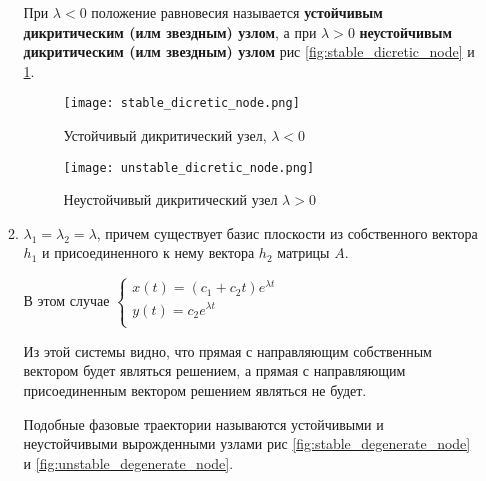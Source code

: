 \documentclass[a4paper, 12pt]{article}
\begin{document}
\begin{enumerate}
\begin{enumerate}
        При $\lambda < 0$ положение равновесия называется \textbf{устойчивым дикритическим (илм звездным) узлом}, а при $\lambda > 0$ \textbf{неустойчивым дикритическим (илм звездным) узлом} рис \ref{fig:stable_dicretic_node} и \ref{fig:unstable_dicretic_node}.

        \begin{figure}[h!]
          \begin{center}
              \begin{minipage}[h!]{0.48\linewidth}
                  \texttt{[image: stable\_dicretic\_node.png]}
                  \caption{Устойчивый дикритический узел, $\lambda < 0$}
                  \label{fig:stable_dicretic_node}
              \end{minipage}
              \hfill
              \begin{minipage}[h!]{0.48\linewidth}
                  \texttt{[image: unstable\_dicretic\_node.png]}
                  \caption{Неустойчивый дикритический узел $\lambda > 0$}
                  \label{fig:unstable_dicretic_node}
              \end{minipage}
          \end{center}
        \end{figure}

        \item $\lambda_1 = \lambda_2 = \lambda$, причем существует базис плоскости из собственного вектора $h_1$ и присоединенного к нему вектора $h_2$ матрицы $A$.
        
        В этом случае
        $\begin{cases}
          x(t) = (c_1 + c_2 t) e^{\lambda t} \\
          y(t) = c_2 e^{\lambda t} \\
        \end{cases}$

        Из этой системы видно, что прямая с направляющим собственным вектором будет являться решением, а прямая с направляющим присоединенным вектором решением являться не будет.
        
        Подобные фазовые траектории называются устойчивыми и неустойчивыми вырожденными узлами рис \ref{fig:stable_degenerate_node} и \ref{fig:unstable_degenerate_node}.


\end{enumerate}
\end{enumerate}
\end{document}
